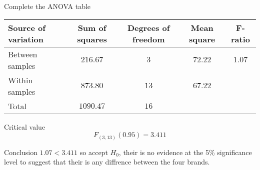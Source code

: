 \begin{example}
        \begin{step}{Complete the ANOVA table}
        \begin{center}
        \begin{tabular}{l|c|c|c|c}
        Source of variation & Sum of squares    & Degrees of freedom    & Mean square   & F-ratio   \\
        \hline
        Between samples     & $216.67$          & $3$                   & $72.22$       & $1.07$    \\
        Within samples      & $873.80$          & $13$                  & $67.22$       &           \\
        \hline
        Total               & $1090.47$         & $16$                  &               &           \\
        \end{tabular}
        \end{center}
        \end{step}

        \begin{step}{Critical value}
        $$
        F_{(3, 13)}(0.95) = 3.411 
        $$
        \end{step}

        \begin{step}{Conclusion}
        $1.07 < 3.411$ so accept $H_0$, their is no evidence at the 5\% significance level to suggest that their is any diffrence between the four brands.
        \end{step}
        \end{example}

    \newpage
